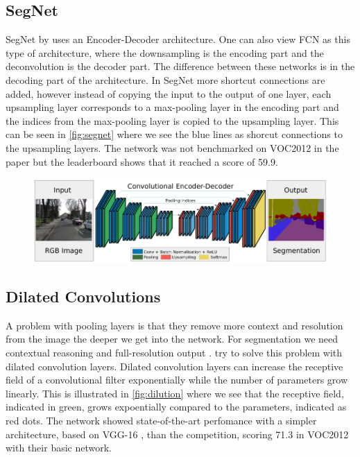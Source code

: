\subsection{SegNet}
SegNet by \citeauthor{Badrinarayanan2015} \cite{Badrinarayanan2015} uses an Encoder-Decoder architecture. One can also view FCN as this type of architecture, where the downsampling is the encoding part and the deconvolution is the decoder part. The difference between these networks is in the decoding part of the architecture. In SegNet more shortcut connections are added, however instead of copying the input to the output of one layer, each upsampling layer corresponds to a max-pooling layer in the encoding part and the indices from the max-pooling layer is copied to the upsampling layer. This can be seen in \autoref{fig:segnet} where we see the blue lines as shorcut connections to the upsampling layers. The network was not benchmarked on VOC2012 in the paper but the leaderboard \cite{PASCALVOC2012a} shows that it reached a score of 59.9. 

\begin{figure}[H]
	\centering
	\includegraphics[width=0.7\linewidth]{fig/segnet.png}
	\label{fig:segnet}
\end{figure}


\subsection{Dilated Convolutions}
A problem with pooling layers is that they remove more context and resolution from the image the deeper we get into the network. For segmentation we need contextual reasoning and full-resolution output \cite{Yu2015}. \citeauthor{Yu2015} \cite{Yu2015} try to solve this problem with dilated convolution layers. Dilated convolution layers can increase the receptive field of a convolutional filter exponentially while the number of parameters grow linearly. This is illustrated in \autoref{fig:dilution} where we see that the receptive field, indicated in green, grows expoentially compared to the parameters, indicated as red dots. The network showed state-of-the-art perfomance with a simpler architecture, based on VGG-16 \cite{Simonyan2014a}, than the competition, scoring 71.3 in VOC2012 with their basic network.

